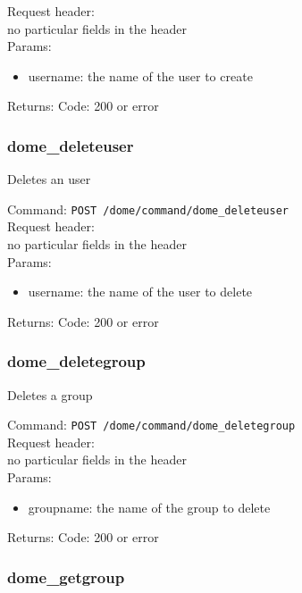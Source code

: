 \documentclass[a4paper,10pt]{scrreprt}
\begin{document}
Request header:\\
no particular fields in the header\\

Params:
\begin{itemize}
 \item username: the name of the user to create
\end{itemize}

Returns:
Code: 200 or error


\subsubsection{dome\_deleteuser}

Deletes an user

Command:
\lstinline"POST /dome/command/dome_deleteuser"\\

Request header:\\
no particular fields in the header\\

Params:
\begin{itemize}
 \item username: the name of the user to delete
\end{itemize}

Returns:
Code: 200 or error


\subsubsection{dome\_deletegroup}

Deletes a group

Command:
\lstinline"POST /dome/command/dome_deletegroup"\\

Request header:\\
no particular fields in the header\\

Params:
\begin{itemize}
 \item groupname: the name of the group to delete
\end{itemize}

Returns:
Code: 200 or error




\subsubsection{dome\_getgroup}
\end{document}
